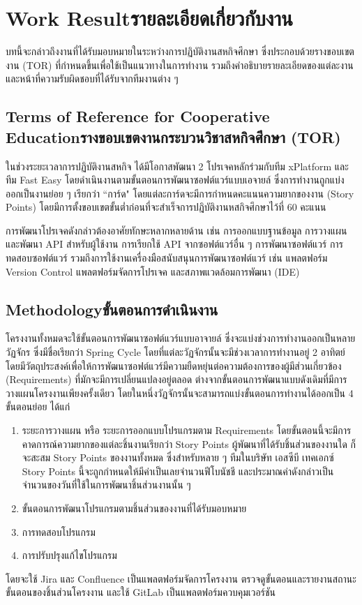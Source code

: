 \chapter{\ifenglish Work Result\else รายละเอียดเกี่ยวกับงาน\fi}
บทนี้จะกล่าวถึงงานที่ได้รับมอบหมายในระหว่างการปฏิบัติงานสหกิจศึกษา ซึ่งประกอบด้วยรางขอบเขตงาน (TOR) ที่กำหนดขึ้นเพื่อใช้เป็นแนวทางในการทำงาน รวมถึงคำอธิบายรายละเอียดของแต่ละงานและหน้าที่ความรับผิดชอบที่ได้รับจากทีมงานต่าง ๆ

\section{\ifenglish Terms of Reference for Cooperative Education\else รางขอบเขตงานกระบวนวิชาสหกิจศึกษา (TOR) \fi}
ในช่วงระยะเวลาการปฏิบัติงานสหกิจ ได้มีโอกาสพัฒนา 2 โปรเจคหลักร่วมกับทีม xPlatform และทีม Fast Easy โดยดำเนินงานตามขั้นตอนการพัฒนาซอฟต์แวร์แบบเอจายล์ ซึ่งการทำงานถูกแบ่งออกเป็นงานย่อย ๆ เรียกว่า ``การ์ด" โดยแต่ละการ์ดจะมีการกำหนดคะแนนความยากของงาน (Story Points) โดยมีการตั้งขอบเขตขั้นต่ำก่อนที่จะสำเร็จการปฎิบัติงานหสกิจศึกษาไว้ที่ 60 คะแนน

การพัฒนาโปรเจคดังกล่าวต้องอาศัยทักษะหลากหลายด้าน เช่น การออกแบบฐานข้อมูล การวางแผนและพัฒนา API สำหรับผู้ใช้งาน การเรียกใช้ API จากซอฟต์แวร์อื่น ๆ การพัฒนาซอฟต์แวร์ การทดสอบซอฟต์แวร์ รวมถึงการใช้งานเครื่องมือสนับสนุนการพัฒนาซอฟต์แวร์ เช่น แพลตฟอร์ม Version Control แพลตฟอร์มจัดการโปรเจค และสภาพแวดล้อมการพัฒนา (IDE)

\section{\ifenglish Methodology\else ขั้นตอนการดำเนินงาน \fi}
โครงงานทั้งหมดจะใช้ขั้นตอนการพัฒนาซอฟต์แวร์แบบอาจายล์ ซึ่งจะแบ่งช่วงการทำงานออกเป็นหลายวัฏจักร ซึ่งมีชื่อเรียกว่า Spring Cycle โดยที่แต่ละวัฏจักรนั้นจะมีช่วงเวลาการทำงานอยู่ 2 อาทิตย์ โดยมีวัตถุประสงค์เพื่อให้การพัฒนาซอฟต์แวร์มีความยืดหยุ่นต่อความต้องการของผู้มีส่วนเกี่ยวข้อง (Requirements) ที่มักจะมีการเปลี่ยนแปลงอยู่ตลอด ต่างจากขั้นตอนการพัฒนาแบบดังเดิมที่มีการวางแผนโครงงานเพียงครั้งเดียว โดยในหนึ่งวัฏจักรนั้นจะสามารถแบ่งขั้นตอนการทำงานได้ออกเป็น 4 ขั้นตอนย่อย ได้แก่
\begin{enumerate}
    \item ระยะการวางแผน หรือ ระยะการออกแบบโปรแกรมตาม Requirements โดยขั้นตอนนี้จะมีการคาดการณ์ความยากของแต่ละชิ้นงานเรียกว่า Story Points ผู้พัฒนาที่ได้รับชิ้นส่วนของงานใด ก็จะสะสม Story Points ของงานทั้งหมด ซึ่งสำหรับหลาย ๆ ทีมในบริษัท เอสซีบี เทคเอกซ์ Story Points นี้จะถูกกำหนดให้มีค่าเป็นเลยจำนวนฟีโบนัชชี และประมาณค่าดังกล่าวเป็นจำนวนของวันที่ใช้ในการพัฒนาชิ้นส่วนงานนั้น ๆ 
    \item ขั้นตอนการพัฒนาโปรแกรมตามชิ้นส่วนของงานที่ได้รับมอบหมาย
    \item การทดสอบโปรแกรม
    \item การปรับปรุงแก้ไขโปรแกรม
\end{enumerate}
โดยจะใช้ Jira และ Confluence เป็นแพลตฟอร์มจัดการโครงงาน ตรวจดูขั้นตอนและรายงานสถานะขั้นตอนของชิ้นส่วนโครงงาน และใช้ GitLab เป็นแพลตฟอร์มควบคุมเวอร์ชัน

